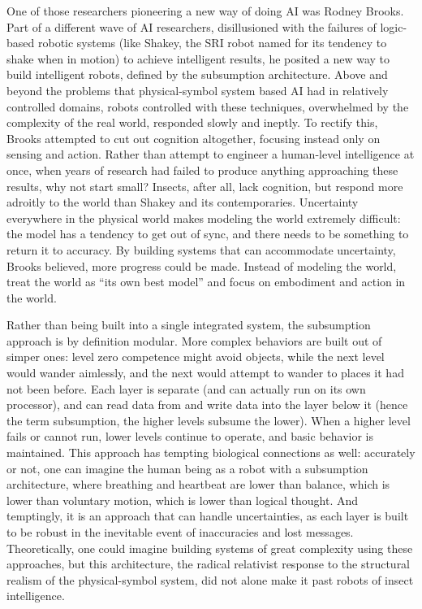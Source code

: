 One of those researchers pioneering a new way of doing AI was Rodney
Brooks. Part of a different wave of AI researchers, disillusioned with
the failures of logic-based robotic systems (like Shakey, the SRI
robot named for its tendency to shake when in motion)\cite[Ch. 10 (CHECK)]{mccorduck} to
achieve intelligent results, he posited a new way to build intelligent
robots, defined by the subsumption architecture.\cite[p. 353]{mobilebrooks} Above and
beyond the problems that physical-symbol system based AI had in
relatively controlled domains, robots controlled with these
techniques, overwhelmed by the complexity of the real world, responded
slowly and ineptly. To rectify this, Brooks attempted to cut out
cognition altogether, focusing instead only on sensing and
action.\cite[Afterword]{mccorduck} Rather than attempt to engineer a
human-level intelligence at once, when years of research had failed to
produce anything approaching these results, why not start small?
Insects, after all, lack cognition, but respond more adroitly to the
world than Shakey and its contemporaries. Uncertainty everywhere in
the physical world makes modeling the world extremely difficult: the
model has a tendency to get out of sync, and there needs to be
something to return it to accuracy. By building systems that can
accommodate uncertainty, Brooks believed, more progress could be
made.\cite[p. 347]{mobilebrooks} Instead of modeling the world, treat
the world as ``its own best model'' and focus on embodiment and action
in the world.\cite[p. 256]{ekbia}

Rather than being built into a single integrated system, the
subsumption approach is by definition modular. More complex behaviors
are built out of simper ones: level zero competence might avoid objects,
while the next level would wander aimlessly, and the next would
attempt to wander to places it had not been before.\cite[p.
  351--352]{mobilebrooks} Each layer is separate (and can actually run
on its own processor), and can read data from
and write data into the layer below it (hence the term subsumption,
the higher levels subsume the lower). When a higher level fails or
cannot run, lower levels continue to operate, and basic behavior is
maintained.\cite[p. 355]{mobilebrooks} This approach has tempting biological connections as well:
accurately or not, one can imagine the human being as a robot with a subsumption
architecture, where breathing and heartbeat are lower than balance,
which is lower than voluntary motion, which is lower than logical
thought. And temptingly, it is an approach that can handle
uncertainties, as each layer is built to be robust in the inevitable
event of inaccuracies and lost messages. Theoretically, one could
imagine building systems of great complexity using these approaches,
but this architecture, the radical relativist response to the
structural realism of the physical-symbol system, did not alone make
it past robots of insect intelligence.

